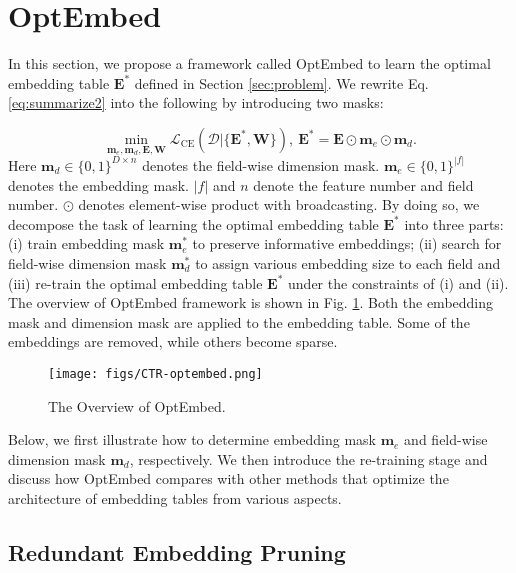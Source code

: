 \documentclass[sigconf]{acmart}
\begin{document}
%
 \section{OptEmbed}
\label{sec:optembed}

In this section, we propose a framework called OptEmbed to learn the optimal embedding table $\mathbf{E}^{*}$ defined in Section \ref{sec:problem}. We rewrite Eq. \ref{eq:summarize2} into the following by introducing two masks:

\begin{equation}
\label{eq:logloss2}
    \min_{\mathbf{m}_e, \mathbf{m}_d, \mathbf{E}, \mathbf{W}} \mathcal{L}_{\text{CE}}(\mathcal{D}|\{\mathbf{E}^{*}, \mathbf{W}\}) ,\ \mathbf{E}^{*} = \mathbf{E} \odot \mathbf{m}_e \odot \mathbf{m}_d.
\end{equation}
Here $\mathbf{m}_d \in \{0, 1\}^{D \times n}$ denotes the field-wise dimension mask. $\mathbf{m}_e \in \{0, 1\}^{|f|}$ denotes the embedding mask. $|f|$ and $n$ denote the feature number and field number. $\odot$ denotes element-wise product with broadcasting. By doing so, we decompose the task of learning the optimal embedding table $\mathbf{E}^{*}$ into three parts: (i) train embedding mask $\mathbf{m}^{*}_e$ to preserve informative embeddings; (ii) search for field-wise dimension mask $\mathbf{m}^{*}_d$ to assign various embedding size to each field and (iii) re-train the optimal embedding table $\mathbf{E}^{*}$ under the constraints of (i) and (ii). The overview of OptEmbed framework is shown in Fig. \ref{fig:overall}. Both the embedding mask and dimension mask are applied to the embedding table. Some of the embeddings are removed, while others become sparse.
\begin{figure}[!t]
    \centering
    \texttt{[image: figs/CTR-optembed.png]}
    \vspace{-5pt}
    \caption{The Overview of OptEmbed.}
    \vspace{-10pt}
    \label{fig:overall}
\end{figure}

Below, we first illustrate how to determine embedding mask $\mathbf{m}_e$ and field-wise dimension mask $\mathbf{m}_d$, respectively. We then introduce the re-training stage and discuss how OptEmbed compares with other methods that optimize the architecture of embedding tables from various aspects.

\subsection{Redundant Embedding Pruning}
\label{sec:feature_mask}
\end{document}
